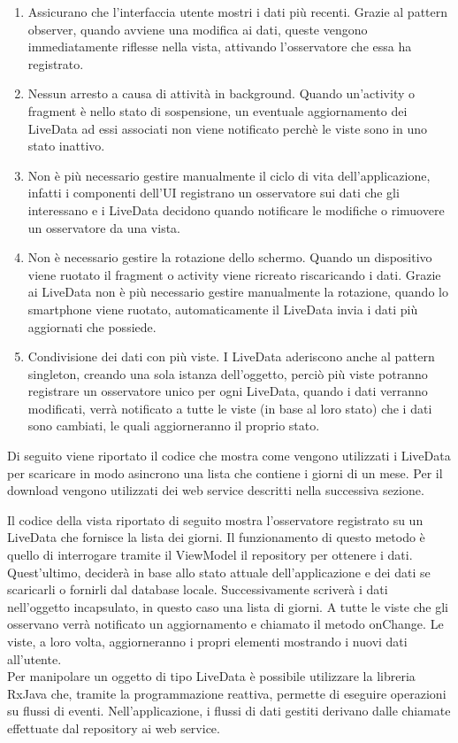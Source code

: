 \documentclass[12pt]{report}
\begin{document}
\begin{enumerate}
	\item Assicurano che l'interfaccia utente mostri i dati più recenti. Grazie al pattern observer, quando avviene una modifica ai dati, queste vengono immediatamente riflesse nella vista, attivando l'osservatore che essa ha registrato.
	\item Nessun arresto a causa di attività in background. Quando un'activity o fragment è nello stato di sospensione, un eventuale aggiornamento dei LiveData ad essi associati non viene notificato perchè le viste sono in uno stato inattivo.
	\item Non è più necessario gestire manualmente il ciclo di vita dell'applicazione, infatti i componenti dell'UI registrano un osservatore sui dati che gli interessano e i LiveData decidono quando notificare le modifiche o rimuovere un osservatore da una vista.
	\item Non è necessario gestire la rotazione dello schermo. Quando un dispositivo viene ruotato il fragment o activity viene ricreato riscaricando i dati. Grazie ai LiveData non è più necessario gestire manualmente la rotazione, quando lo smartphone viene ruotato, automaticamente il LiveData invia i dati più aggiornati che possiede.
	\item Condivisione dei dati con più viste. I LiveData aderiscono anche al pattern singleton\cite{singleton}, creando una sola istanza dell’oggetto, perciò più viste potranno registrare un osservatore unico per ogni LiveData, quando i dati verranno modificati, verrà notificato a tutte le viste (in base al loro stato) che i dati sono cambiati, le quali aggiorneranno il proprio stato.

\end{enumerate}
Di seguito viene riportato il codice che mostra come vengono utilizzati i LiveData per scaricare in modo asincrono una lista che contiene i giorni di un mese. Per il download vengono utilizzati dei web service descritti nella successiva sezione.

Il codice della vista riportato di seguito mostra l'osservatore registrato su un LiveData che fornisce la lista dei giorni. Il funzionamento di questo metodo è quello di interrogare tramite il ViewModel il repository per ottenere i dati. Quest'ultimo, deciderà in base allo stato attuale dell'applicazione e dei dati se scaricarli o fornirli dal database locale. Successivamente scriverà i dati nell'oggetto incapsulato, in questo caso una lista di giorni. A tutte le viste che gli osservano verrà notificato un aggiornamento e chiamato il metodo onChange. Le viste, a loro volta, aggiorneranno i propri elementi mostrando i nuovi dati all'utente.
\\

Per manipolare un oggetto di tipo LiveData è possibile utilizzare la libreria RxJava che, tramite la programmazione reattiva, permette di eseguire operazioni su flussi di eventi. Nell'applicazione, i flussi di dati gestiti derivano dalle chiamate effettuate dal repository ai web service.
\end{document}
